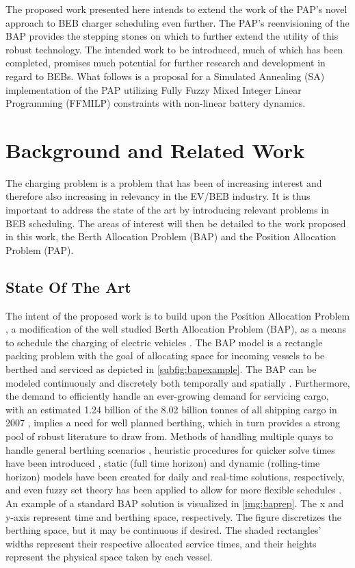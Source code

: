 \documentclass[ee,msthesis]{usuthesis}
\begin{document}
The proposed work presented here intends to extend the work of the PAP's novel approach to BEB charger scheduling even
further. The PAP's reenvisioning of the BAP provides the stepping stones on which to further extend the utility of this
robust technology. The intended work to be introduced, much of which has been completed, promises much potential for
further research and development in regard to BEBs. What follows is a proposal for a Simulated Annealing (SA)
implementation of the PAP utilizing Fully Fuzzy Mixed Integer Linear Programming (FFMILP) constraints with non-linear
battery dynamics.

\section{Background and Related Work}
\label{sec:background-and-related-work}
The charging problem is a problem that has been of increasing interest and therefore also increasing in relevancy in the
EV/BEB industry. It is thus important to address the state of the art by introducing relevant problems in BEB
scheduling. The areas of interest will then be detailed to the work proposed in this work, the Berth Allocation Problem
(BAP) and the Position Allocation Problem (PAP).

\subsection{State Of The Art}
\label{sec:orgc439be3}
The intent of the proposed work is to build upon the Position Allocation Problem \cite{qarebagh-2019-optim-sched}, a
modification of the well studied Berth Allocation Problem (BAP), as a means to schedule the charging of electric
vehicles \cite{buhrkal-2011-model-discr,frojan-2015-contin-berth,imai-2001-dynam-berth}. The BAP model is a rectangle
packing problem with the goal of allocating space for incoming vessels to be berthed and serviced as depicted in
\autoref{subfig:bapexample}. The BAP can be modeled continuously and discretely both temporally and spatially
\cite{buhrkal-2011-model-discr,frojan-2015-contin-berth}. Furthermore, the demand to efficiently handle an
ever-growing demand for servicing cargo, with an estimated 1.24 billion of the 8.02 billion tonnes of all shipping cargo
in 2007 \cite{buhrkal-2011-model-discr}, implies a need for well planned berthing, which in turn provides a strong pool
of robust literature to draw from. Methods of handling multiple quays to handle general berthing scenarios
\cite{frojan-2015-contin-berth,dai-2008-suppl-chain-analy}, heuristic procedures for quicker solve times have been
introduced \cite{imai-2001-dynam-berth}, static (full time horizon) and dynamic (rolling-time horizon) models have been
created for daily and real-time solutions, respectively, and even fuzzy set theory has been applied to allow for more
flexible schedules \cite{bello-2019-fuzzy-activ}. An example of a standard BAP solution is visualized in \ref{img:baprep}.
The x and y-axis represent time and berthing space, respectively. The figure discretizes the berthing space, but it may
be continuous if desired. The shaded rectangles' widths represent their respective allocated service times, and their
heights represent the physical space taken by each vessel.
\end{document}
